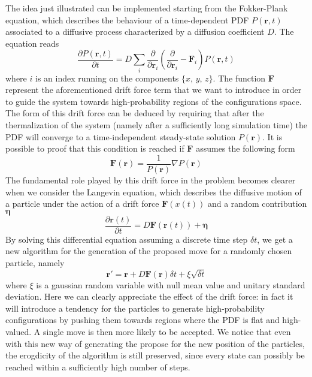 The idea just illustrated can be implemented starting from the Fokker-Plank equation, which describes the behaviour of a time-dependent PDF $P(\bm{r}, t)$ associated to a diffusive process characterized by a diffusion coefficient $D$. The equation reads
\begin{equation*}
    \frac{\partial P(\bm{r}, t)}{\partial t} = D \sum_i \frac{\partial}{\partial \bm{r}_i} \left( \frac{\partial}{\partial \bm{r}_i} - \bm{F}_i \right) P(\bm{r}, t)
\end{equation*}
where $i$ is an index running on the components $\{x,\,y,\,z\}$. The function $\bm{F}$ represent the aforementioned drift force term that we want to introduce in order to guide the system towards high-probability regions of the configurations space. The form of this drift force can be deduced by requiring that after the thermalization of the system (namely after a sufficiently long simulation time) the PDF will converge to a time-independent steady-state solution $P(\bm{r})$. It is possible to proof that this condition is reached if $\bm{F}$ assumes the following form
\begin{equation*}
    \bm{F}(\bm{r}) = \frac{1}{P(\bm{r})} \nabla P(\bm{r})
\end{equation*}
The fundamental role played by this drift force in the problem becomes clearer when we consider the Langevin equation, which describes the diffusive motion of a particle under the action of a drift force $\bm{F}(x(t))$ and a random contribution $\bm{\eta}$ 
\begin{equation*}
    \frac{\partial \bm{r}(t)}{\partial t} = D \bm{F}(\bm{r}(t)) + \bm{\eta}  
\end{equation*}
By solving this differential equation assuming a discrete time step $\delta t$, we get a new algorithm for the generation of the proposed move for a randomly chosen particle, namely
\begin{equation*}
    \bm{r}' = \bm{r} + D \bm{F}(\bm{r}) \delta t + \xi \sqrt{\delta t}
\end{equation*}
where $\xi$ is a gaussian random variable with null mean value and unitary standard deviation. Here we can clearly appreciate the effect of the drift force: in fact it will introduce a tendency for the particles to generate high-probability configurations by pushing them towards regions where the PDF is flat and high-valued. A single move is then more likely to be accepted. We notice that even with this new way of generating the propose for the new position of the particles, the erogdicity of the algorithm is still preserved, since every state can possibly be reached within a sufficiently high number of steps. 

